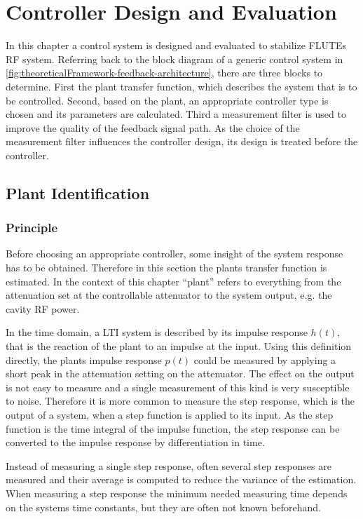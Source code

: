 \chapter{Controller Design and Evaluation}
In this chapter a control system is designed and evaluated to stabilize FLUTEs RF system.
Referring back to the block diagram of a generic control system in \autoref{fig:theoreticalFramework-feedback-architecture}, there are three blocks to determine.
First the plant transfer function, which describes the system that is to be controlled.
Second, based on the plant, an appropriate controller type is chosen and its parameters are calculated.
Third a measurement filter is used to improve the quality of the feedback signal path. As the choice of the measurement filter influences the controller design, its design is treated before the controller.

\section{Plant Identification}
\subsection{Principle}
Before choosing an appropriate controller, some insight of the system response has to be obtained. Therefore in this section the plants transfer function is estimated. In the context of this chapter ``plant'' refers to everything from the attenuation set at the controllable attenuator to the system output, e.g. the cavity RF power.

In the time domain, a LTI system is described by its impulse response $h(t)$, that is the reaction of the plant to an impulse at the input.
Using this definition directly, the plants impulse response $p(t)$ could be measured by applying a short peak in the attenuation setting on the attenuator. The effect on the output is not easy to measure and a single measurement of this kind is very susceptible to noise.
Therefore it is more common to measure the step response, which is the output of a system, when a step function is applied to its input. As the step function is the time integral of the impulse function, the step response can be converted to the impulse response by differentiation in time.

Instead of measuring a single step response, often several step responses are measured and their average is computed to reduce the variance of the estimation. When measuring a step response the minimum needed measuring time depends on the systems time constants, but they are often not known beforehand.

